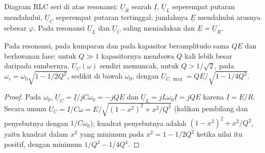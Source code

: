 \begin{omfigure}

{\small Diagram  RLC seri di atas resonansi: $\underline U_R$
searah $\underline I$, $\underline U_L$ seperempat putaran mendahului,
$\underline U_C$ seperempat putaran tertinggal; jumlahnya $\underline E$
mendahului arusnya sebesar $\varphi$. Pada resonansi $\underline U_L$
dan $\underline U_C$ saling meniadakan dan $\underline E = \underline U_R$.}
\end{omfigure}

\begin{proposition}\label{prop:b1:sinusoidal-impedance:overvoltage}
Pada resonansi,  pada kumparan dan pada kapasitor beramplitudo
sama $QE$ dan berlawanan fase: untuk $Q \gg 1$ kapasitornya membawa
 $Q$ kali lebih besar daripada  sumbernya. 
$U_C(\omega)$ sendiri memuncak, untuk $Q > 1/\sqrt2$, pada $\omega_r =
\omega_0\sqrt{1 - 1/2Q^2}$, sedikit di bawah $\omega_0$, dengan
$U_{C,\max} = QE/\sqrt{1 - 1/4Q^2}$.
\end{proposition}

\begin{proof}
Pada $\omega_0$, $\underline U_C = \underline I/jC\omega_0 = -jQE$ dan
$\underline U_L = jL\omega_0\underline I = jQE$ karena $I = E/R$. Secara
umum $U_C = I/C\omega = E/\sqrt{(1 - x^2)^2 + x^2/Q^2}$ (kalikan
pembilang dan penyebutnya dengan $1/C\omega_0$); kuadrat penyebutnya
adalah $(1 - x^2)^2 + x^2/Q^2$, yaitu kuadrat dalam $x^2$ yang minimum pada $x^2 =
1 - 1/2Q^2$ ketika nilai itu positif, dengan minimum $1/Q^2 - 1/4Q^4$.
\end{proof}

